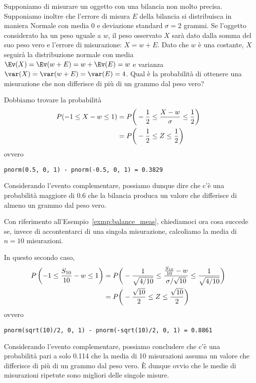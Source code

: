 \begin{exmp}
\label{exmp:balance_meas}
Supponiamo di misurare un oggetto con una bilancia non molto precisa. 
Supponiamo inoltre che l'errore di misura $E$ della bilancia si distribuisca in maniera Normale con media $0$ e deviazione standard $\sigma = 2$ grammi. 
Se l'oggetto considerato ha un peso uguale a $w$, il peso osservato $X$ sarà dato dalla somma del suo peso vero e l'errore di misurazione: $X = w + E$. 
Dato che $w$ è una costante, $X$ seguirà la distribuzione normale con media $\Ev(X) = \Ev(w + E) = w + \Ev(E) = w$ e varianza $\var(X) = \var(w + E) = \var(E) = 4$. 
Qual è la probabilità di ottenere una misurazione che non differisce di più di un grammo dal peso vero? 
\end{exmp}
\begin{solu}
Dobbiamo trovare la probabilità
\begin{align}
P(-1 \leq X - w \leq 1)  &= P\bigg(-\frac{1}{2} \leq \frac{X - w}{\sigma} \leq \frac{1}{2}\bigg)\notag\\ &= P\bigg(-\frac{1}{2} \leq Z \leq \frac{1}{2}\bigg)\notag
\end{align}
ovvero 

\begin{lstlisting}
pnorm(0.5, 0, 1) - pnorm(-0.5, 0, 1) = 0.3829
\end{lstlisting}
\noindent
Considerando l'evento complementare, possiamo dunque dire che c'è una probabilità maggiore di $0.6$ che la bilancia produca un valore che differisce di almeno un grammo dal peso vero.
\end{solu}

\begin{exmp}
Con riferimento all'Esempio~\ref{exmp:balance_meas}, chiediamoci ora cosa succede se, invece di accontentarci di una singola misurazione, calcoliamo la media di $n = 10$ misurazioni. 
\end{exmp}
\begin{solu}
In questo secondo caso,
\begin{align}
P\left(-1 \leq \frac{S_{10}}{10} - w \leq 1\right) 
&= P\bigg(-\frac{1}{\sqrt{4/10}} \leq \frac{\frac{S_{10}}{10} - w}{\sigma/\sqrt{10}} \leq \frac{1}{\sqrt{4/10}}\bigg)\notag\\ 
&= P\bigg(-\frac{\sqrt{10}}{2} \leq Z \leq \frac{\sqrt{10}}{2}\bigg)\notag
\end{align}
ovvero 

\begin{lstlisting}
pnorm(sqrt(10)/2, 0, 1) - pnorm(-sqrt(10)/2, 0, 1) = 0.8861
\end{lstlisting}

\noindent
Considerando l'evento complementare, possiamo concludere che c'è una probabilità pari a solo 0.114 che la media di 10 misurazioni assuma un valore che differisce di più di un grammo dal peso vero. È dunque ovvio che le medie di misurazioni ripetute sono migliori delle singole misure.
\end{solu}


